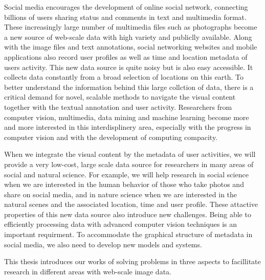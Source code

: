 Social media encourages the development of online social network, connecting billions of users sharing status and comments in text and multimedia format.
These increasingly large number of multimedia files such as photographs become a new source of web-scale data with high variety and publiclly available.
Along with the image files and text annotations, social networking websites and mobile applications also record user profiles as well as time and location metadata of users activity.
This new data source is quite noisy but is also easy accessible. 
It collects data constantly from a broad selection of locations on this earth. 
To better understand the information behind this large collction of data, there is a critical demand for novel, scalable methods to navigate the visual content together with the textual annotation and user activity.
Researchers from computer vision, multimedia, data mining and machine learning become more and more interested in this interdisplinery area, especially with the progress in computer vision and with the development of computing compacity.

When we integrate the visual content by the metadata of user activities, we will provide a very low-cost, large scale data source for researchers in many areas of social and natural science.
For example, we will help research in social science when we are interested in the human behavior of those who take photos and share on social media, and in nature science when we are interested in the natural scenes and the associated location, time and user profile.
These attactive properties of this new data source also introduce new challenges. 
Being able to efficiently processing data with advanced computer vision techniques is an important requirment.
To accommodate the graphical structure of metadata in social media, we also need to develop new models and systems.

This thesis introduces our works of solving problems in three aspects to facillitate research in different areas with web-scale image data.
